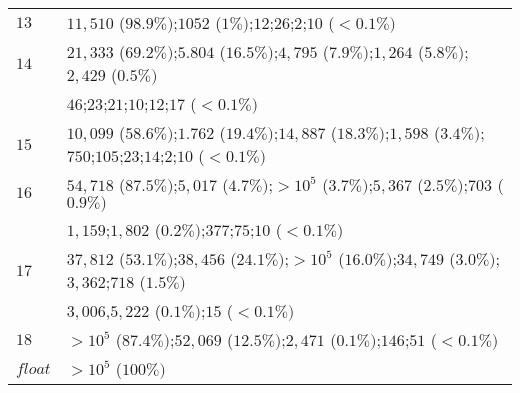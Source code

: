 \begin{table*}[!t]
\begin{tabular}{l  l  }
	$13$    & $11,510$ {\scriptsize($ 98.9\%)$};$1052$ {\scriptsize($1 \%)$};$12$;$26$;$2$;$10$ {\scriptsize($<0.1\% )$}                                                                                                                 \\
	$14$    & $21,333$ {\scriptsize($69.2\% )$};$5.804$ {\scriptsize($16.5\%  )$};$4,795$ {\scriptsize($7.9\%  )$};$1,264$ {\scriptsize($5.8 \% )$};$2,429$ {\scriptsize($0.5\% )$}                                                      \\
	        & $46$;$23$;$21$;$10$;$12$;$17$ {\scriptsize($<0.1\%  )$}                                                                                                                                                                    \\
	$15$    & $10,099$ {\scriptsize($58.6 \%)$};$1.762$ {\scriptsize($19.4 \%)$};$14,887$ {\scriptsize($18.3\%)$};$1,598$ {\scriptsize($3.4\%)$};$750$;$105$;$23$;$14$;$2$;$10$ {\scriptsize($<0.1\%)$}                                  \\
	$16$    & $54,718$ {\scriptsize($87.5\% )$};$5,017$ {\scriptsize($4.7\% )$};$>10^5$ {\scriptsize($3.7\% )$};$5,367$ {\scriptsize($2.5\% )$};$703$ {\scriptsize($0.9\% )$}                                                            \\
	        & $1,159$;$1,802$ {\scriptsize($0.2\% )$};$377$;$75$;$10$ {\scriptsize($<0.1\%  )$}                                                                                                                                          \\
	$17$    & $37,812$ {\scriptsize($53.1\% )$};$38,456$ {\scriptsize($24.1\% )$};$>10^5$ {\scriptsize($16.0\%)$};$34,749$ {\scriptsize($3.0\% )$};$3,362$;$718$ {\scriptsize($1.5\%)$}                                                  \\
	        & $3,006$,$5,222$ {\scriptsize($0.1\% )$};$15$ {\scriptsize($<0.1 \%)$}                                                                                                                                                      \\
	$18$    & $>10^5$ {\scriptsize($87.4\%)$};$52,069$ {\scriptsize($12.5\% )$};$2,471$ {\scriptsize($0.1\% )$};$146$;$51$ {\scriptsize($<0.1 \%)$}                                                                                      \\
	$float$ & $>10^5$ {\scriptsize($100\% )$}                                                                                                                                                                                            \\ \hline
\end{tabular}

\end{table*}

